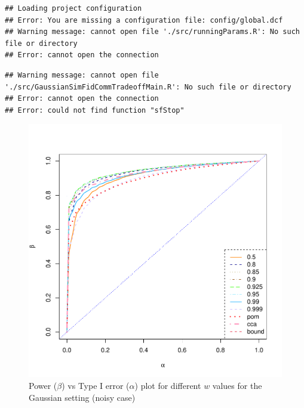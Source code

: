 \documentclass[11pt]{article} %
\begin{document}
\begin{knitrout}
\color{fgcolor}\begin{kframe}
\begin{verbatim}
## Loading project configuration
## Error: You are missing a configuration file: config/global.dcf
## Warning message: cannot open file './src/runningParams.R': No such file or directory
## Error: cannot open the connection
\end{verbatim}
\end{kframe}
\end{knitrout}



\begin{knitrout}
\color{fgcolor}\begin{kframe}
\begin{verbatim}
## Warning message: cannot open file './src/GaussianSimFidCommTradeoffMain.R': No such file or directory
## Error: cannot open the connection
## Error: could not find function "sfStop"
\end{verbatim}
\end{kframe}
\end{knitrout}



\begin{figure}
\includegraphics[scale=0.35]{MVN-FC-Tradeoff-OOSc0-01-n150.pdf}
\caption{Power ($\beta$) vs Type I error ($\alpha$) plot for different $w$ values for the Gaussian setting (noisy case)}
\label{fig:MVN-c001-power-alpha}
\end{figure}
\end{document}
